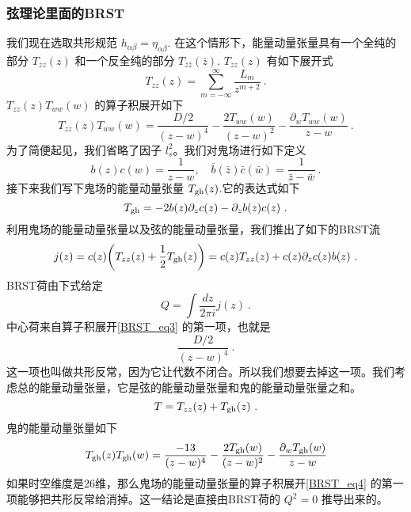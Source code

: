 \subsubsection{弦理论里面的BRST}
我们现在选取共形规范 $h_{\alpha\beta} = \eta_{\alpha\beta}$. 在这个情形下，能量动量张量具有一个全纯的部分 $T_{zz}(z)$ 和一个反全纯的部分 $T_{\bar z\bar z}(\bar z)$. $T_{zz}(z)$ 有如下展开式
\begin{equation}
T_{zz}(z) = \sum_{m=-\infty}^{\infty} \frac{L_{m}}{z^{m+2}}~.
\end{equation}
$T_{zz}(z)T_{ww}(w)$ 的算子积展开如下
\begin{equation}\label{BRST_eq3}
T_{zz}(z)T_{ww}(w) = \frac{D/2}{(z-w)^4} - \frac{2T_{ww}(w)}{(z-w)^2} - \frac{\partial_wT_{ww}(w)}{z-w}~.
\end{equation}
为了简便起见，我们省略了因子 $l_s^2$。我们对鬼场进行如下定义
\begin{equation}
b(z)c(w) = \frac{1}{z-w},\quad \bar b (\bar z) \bar c (\bar w) = \frac{1}{\bar z- \bar w} ~.
\end{equation} 
接下来我们写下鬼场的能量动量张量 $T_{\rm gh}(z)$.它的表达式如下
\begin{equation}
T_{\rm gh} = -2 b(z) \partial_z c(z) - \partial_z b(z) c(z)~.
\end{equation}
利用鬼场的能量动量张量以及弦的能量动量张量，我们推出了如下的BRST流
\begin{equation}
j(z) = c(z) \bigg( T_{zz} (z) + \frac{1}{2} T_{\rm gh}(z) \bigg) = c(z) T_{zz} (z) + c(z) \partial_z c(z) b(z)~.
\end{equation}
BRST荷由下式给定
\begin{equation}
Q = \int \frac{dz}{2\pi i} j(z)~.
\end{equation}
中心荷来自算子积展开\autoref{BRST_eq3} 的第一项，也就是
\begin{equation}
\frac{D/2}{(z-w)^4}~.
\end{equation}
这一项也叫做共形反常，因为它让代数不闭合。所以我们想要去掉这一项。我们考虑总的能量动量张量，它是弦的能量动量张量和鬼的能量动量张量之和。
\begin{equation}
T = T_{zz} (z) + T_{\rm gh} (z)~.
\end{equation}
鬼的能量动量张量如下
\begin{equation}\label{BRST_eq4}
T_{\rm gh}(z) T_{\rm gh} (w) = \frac{-13}{(z-w)^4} - \frac{2T_{\rm gh} (w) }{(z-w)^2} - \frac{\partial_w T_{\rm gh}(w)}{z-w}
\end{equation}
如果时空维度是26维，那么鬼场的能量动量张量的算子积展开\autoref{BRST_eq4} 的第一项能够把共形反常给消掉。这一结论是直接由BRST荷的 $Q^2=0$ 推导出来的。

